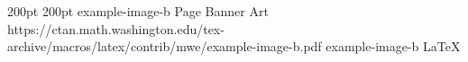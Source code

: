 
\MonsterBannerGraphic%
	{}%
	{200pt}%
	{200pt}%
	{example-image-b}%
	{}%
	{Page \thepage}%
	{Banner Art}%
	{https://ctan.math.washington.edu/tex-archive/macros/latex/contrib/mwe/example-image-b.pdf}%
	{example-image-b}%
	{LaTeX}%

\lipsum[1-1]

